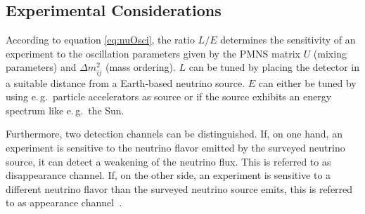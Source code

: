\subsection{Experimental Considerations}
\label{sec:neutrinoPhysicsOscillationsExpConsiderations}
According to equation \eqref{eq:nuOsci}, the ratio $L/E$ determines the sensitivity of an experiment to the oscillation parameters given by the PMNS matrix $U$ (mixing parameters) and $\Delta m^2_{ij}$ (mass ordering). $L$ can be tuned by placing the detector in a suitable distance from a Earth-based neutrino source. $E$ can either be tuned by using e.\,g.~particle accelerators as source or if the source exhibits an energy spectrum like e.\,g.~the Sun. 

Furthermore, two detection channels can be distinguished. If, on one hand, an experiment is sensitive to the neutrino flavor emitted by the surveyed neutrino source, it can detect a weakening of the neutrino flux. This is referred to as disappearance channel. If, on the other side, an experiment is sensitive to a different neutrino flavor than the surveyed neutrino source emits, this is referred to as appearance channel~\cite{zuber2011neutrino}.

